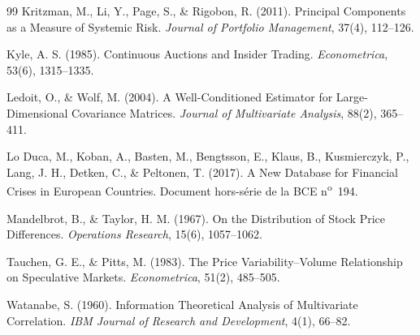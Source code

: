 \documentclass[11pt]{article}
\theoremstyle{definition}
\begin{document}
\begin{thebibliography}{99}
 Kritzman, M., Li, Y., Page, S., \& Rigobon, R. (2011). Principal Components as a Measure of Systemic Risk. \textit{Journal of Portfolio Management}, 37(4), 112--126.

 Kyle, A. S. (1985). Continuous Auctions and Insider Trading. \textit{Econometrica}, 53(6), 1315--1335.

 Ledoit, O., \& Wolf, M. (2004). A Well-Conditioned Estimator for Large-Dimensional Covariance Matrices. \textit{Journal of Multivariate Analysis}, 88(2), 365--411.

 Lo Duca, M., Koban, A., Basten, M., Bengtsson, E., Klaus, B., Kusmierczyk, P., Lang, J. H., Detken, C., \& Peltonen, T. (2017). A New Database for Financial Crises in European Countries. Document hors-série de la BCE n\textsuperscript{o}~194.

 Mandelbrot, B., \& Taylor, H. M. (1967). On the Distribution of Stock Price Differences. \textit{Operations Research}, 15(6), 1057--1062.

 Tauchen, G. E., \& Pitts, M. (1983). The Price Variability--Volume Relationship on Speculative Markets. \textit{Econometrica}, 51(2), 485--505.

 Watanabe, S. (1960). Information Theoretical Analysis of Multivariate Correlation. \textit{IBM Journal of Research and Development}, 4(1), 66--82.

\end{thebibliography}
\end{document}
